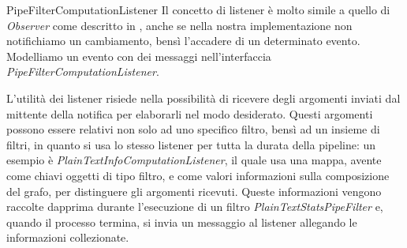 \begin{paragraph}{PipeFilterComputationListener}
  Il concetto di listener \`e molto simile a quello di \emph{Observer}
  come descritto in \cite{SmalltalkCompanion98}, anche se nella nostra
  implementazione non notifichiamo un cambiamento, bens\`i l'accadere
  di un determinato evento. Modelliamo un evento con dei messaggi
  nell'interfaccia \emph{PipeFilterComputationListener}.

  L'utilit\`a dei listener risiede nella possibilit\`a di ricevere
  degli argomenti inviati dal mittente della notifica per elaborarli
  nel modo desiderato. Questi argomenti possono essere relativi non
  solo ad uno specifico filtro, bens\`i ad un insieme di filtri, in
  quanto si usa lo stesso listener per tutta la durata della pipeline:
  un esempio \`e \emph{PlainTextInfoComputationListener}, il quale usa
  una mappa, avente come chiavi oggetti di tipo filtro, e come valori
  informazioni sulla composizione del grafo, per distinguere gli
  argomenti ricevuti. Queste informazioni vengono raccolte dapprima
  durante l'esecuzione di un filtro \emph{PlainTextStatsPipeFilter} e,
  quando il processo termina, si invia un messaggio al listener
  allegando le informazioni collezionate.
\end{paragraph}

